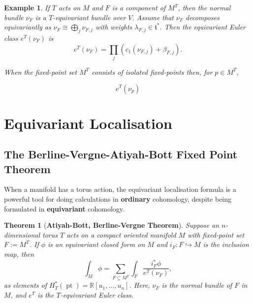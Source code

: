 \documentclass{article}
\newtheorem{theorem}{Theorem}[section]
\newtheorem{example}{Example}
\newcommand{\RR}{\mathbb{R}}
\newcommand{\mft}{\mathfrak{t}}
\DeclareMathOperator{\pt}{pt}
\begin{document}
\begin{example}
	If $T$ acts on $M$ and $F$ is a component of $M^{T}$, then the normal bundle $\nu_{F}$ is a $T$-equivariant bundle over $V$. Assume that $\nu_{F}$ decomposes equivariantly as $\nu_{F} \cong \bigoplus_{j} \nu_{F, j}$ with weights $\lambda_{F, j} \in \mft^{\ast}$. Then the equivariant Euler class $e^{T}(\nu_{F})$ is
	\begin{equation*}
		e^{T}(\nu_{F}) = \prod\limits_{j} \left( c_{1}(\nu_{F,j}) + \beta_{F,j} \right).
	\end{equation*}

	When the fixed-point set $M^{T}$ consists of isolated fixed-points then, for $p \in M^{T}$,
	
	\begin{equation*}
		e^{T}(\nu_{p})
	\end{equation*}

\end{example}



\newpage










\newpage

\section{Equivariant Localisation}






\subsection{The Berline-Vergne-Atiyah-Bott Fixed Point Theorem}

When a manifold has a torus action, the equivariant localisation formula is a powerful tool for doing calculations in \textbf{ordinary} cohomology, despite being formulated in \textbf{equivariant} cohomology.

\begin{theorem}[\textbf{Atiyah-Bott, Berline-Vergne Theorem}]
	Suppose an $n$-dimensional torus $T$ acts on a compact oriented manifold $M$ with fixed-point set $F := M^{T}$. If $\phi$ is an equivariant closed form on $M$ and $i_{F}: F \hookrightarrow M$ is the inclusion map, then
	\begin{equation*}
		\int_{M} \phi = \sum\limits_{F \subseteq M^{T}} \int_{F} \frac{i_{F}^{\ast} \phi}{e^{T}(\nu_{F})},
	\end{equation*}
	as elements of $H_{T}^{\ast}(\pt) = \RR[u_{1}, \ldots, u_{n}]$. Here, $\nu_{F}$ is the normal bundle of $F$ in $M$, and $e^{T}$ is the $T$-equivariant Euler class.
\end{theorem}
\end{document}
